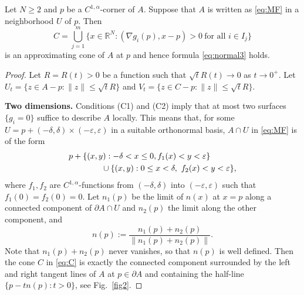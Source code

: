 \documentclass[graybox]{svmult}
\newcommand{\ep}{\varepsilon}
\newcommand{\R}{\mathbb{R}}  %
\renewcommand{\AA}{A}  %
\newcommand{\pp}{p}
\begin{document}
\begin{theorem}\label{prop:corner}  Let $N\ge2$ and $\pp$ be a $C^{1,\alpha}$-corner of $\AA$. Suppose that $\AA$ is written as \eqref{eq:MF} in a neighborhood $U$ of $\pp$. Then 
\begin{equation}\label{eq:C}
C= \bigcup_{j=1}^m \{x \in \R^N: (\nabla g_i (\pp),x-\pp)>0~\text{for all $i \in I_j$}\}
\end{equation}
 is an approximating cone of $\AA$ at $\pp$ and hence formula \eqref{eq:normal3} holds. 
\end{theorem}
\begin{proof} 
Let $R=R(t)>0$ be a function such that $\sqrt{t}R(t)\to0$ as $t\to0^+$. Let $U_t=\{z \in \AA-p: \|z\|\leq \sqrt{t}R\}$ and $V_t=\{z\in C - \pp: \|z\|\le \sqrt{t}R\}$. 


\vspace{2mm}
\noindent
\textbf{Two dimensions.} Conditions (C1) and (C2) imply that at most two surfaces $\{g_i=0\}$ suffice to describe $\AA$ locally. This means that, for some $U = p+ (-\delta,\delta)\times (-\ep,\ep)$ in a suitable orthonormal basis, $\AA \cap U$ in \eqref{eq:MF} is of the form 
\begin{align} 
&\pp + \{(x,y): -\delta < x \le 0,  f_1(x) < y <\ep \} \notag  \\
&\qquad\qquad \cup \{(x,y): 0\le x < \delta,~ f_2(x) < y < \ep \}, \label{eq:A}
\end{align}
where $f_1, f_2$ are $C^{1,\alpha}$-functions from $(-\delta,\delta)$ into $(-\ep,\ep)$ such that $f_1(0)=f_2(0)=0$.  
Let $n_1(\pp)$ be the limit of $n(x)$ at $x=\pp$ along a connected component of $\partial\AA\cap U$ and $n_2(\pp)$ the limit along the other component, and   
\begin{equation}\label{eq:n_corner}
n(\pp):=\frac{n_1(\pp)+n_2(\pp)}{\|n_1(\pp)+n_2(\pp)\|}. 
\end{equation}
Note that $n_1(\pp) + n_2(\pp)$ never vanishes, so that $n(\pp)$ is well defined. 
Then the cone $C$ in \eqref{eq:C} is exactly the connected component surrounded by the left and right tangent lines of $\AA$ at $\pp\in \partial \AA$ and containing the half-line $\{\pp -t n(\pp): t>0\}$, see Fig.~\ref{fig2}. 



\end{proof}
\end{document}
